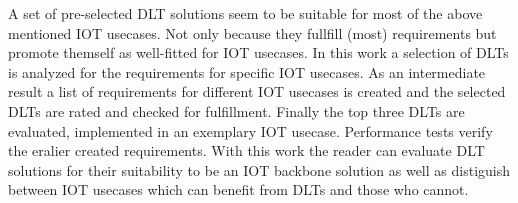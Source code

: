 \documentclass[
    ngerman,american
    ]{scrartcl}
\newcommand{\lang}{en}
\begin{document}
\begin{description}[style=unboxed]
            \item [\questionThree{\lang}]
                A set of pre-selected DLT solutions seem to be suitable for most of the above mentioned IOT usecases.
                Not only because they fullfill (most) requirements but promote themself as well-fitted for IOT usecases.
                In this work a selection of DLTs is analyzed for the requirements for specific IOT usecases.
                As an intermediate result a list of requirements for different IOT usecases is created and the selected DLTs are rated and checked for fulfillment.
                Finally the top three DLTs are evaluated, implemented in an exemplary IOT usecase. Performance tests verify the eralier created requirements.
                With this work the reader can evaluate DLT solutions for their suitability to be an IOT backbone solution as well as distiguish between IOT usecases which can benefit from DLTs and those who cannot.



\end{description}
\end{document}
